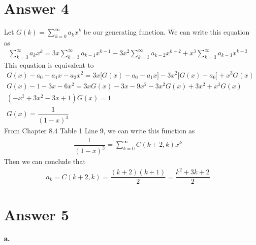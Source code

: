 \documentclass[11pt]{article}
\begin{document}
\section*{Answer 4}
    Let $G(k) =\sum_{k=0}^{\infty} a_k x^k$ be our generating function.
    We can write this equation as
    \begin{gather*}
        \sum_{k=3}^{\infty} a_k x^k = 3x \sum_{k=3}^{\infty} a_{k-1}x^{k-1} -3x^2 \sum_{k=3}^{\infty} a_{k-2}x^{k-2} + x^3 \sum_{k=3}^{\infty} a_{k-3}x^{k-3}
    \end{gather*}
    This equation is equivalent to
    \begin{gather*}
        G(x) -a_0-a_1x-a_2x^2 = 3x \big[G(x)-a_0-a_1x \big] -3x^2 \big[G(x)-a_0 \big] + x^3 G(x)\\
        G(x)-1-3x-6x^2 = 3x G(x)-3x-9x^2-3x^2G(x)+3x^2+x^3G(x)\\
        (-x^3+3x^2-3x+1)G(x) = 1 \\
        G(x) = \dfrac{1}{(1-x)^3}
    \end{gather*}
    From Chapter 8.4 Table 1 Line 9, we can write this function as 
    \begin{gather*}
       \dfrac{1}{(1-x)^3} =  \sum_{k=0}^{\infty} C(k+2,k)x^k 
    \end{gather*}
    Then we can conclude that
    \begin{gather*}
        a_k = C(k+2,k) = \dfrac{(k+2)(k+1)}{2} = \dfrac{k^2+3k+2}{2}
    \end{gather*}
    

\section*{Answer 5}
\paragraph{a.}
\end{document}
